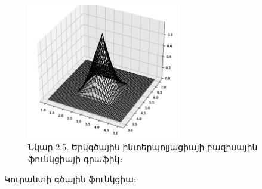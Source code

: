 \documentclass[fleqn, bachelor,subf,12pt,notitlepage]{article}
\begin{document}
\begin{figure}[H]
\centering
\includegraphics[width=0.6\textwidth]{images/bilinear_basis_function}
\captionsetup{labelformat=empty}
\caption{Նկար 2.5. Երկգծային ինտերպոլյացիայի բազիսային ֆունկցիայի գրաֆիկ։}
\end{figure}

\newpage 


\noindent Կուրանտի գծային ֆունկցիա։
\end{document}
